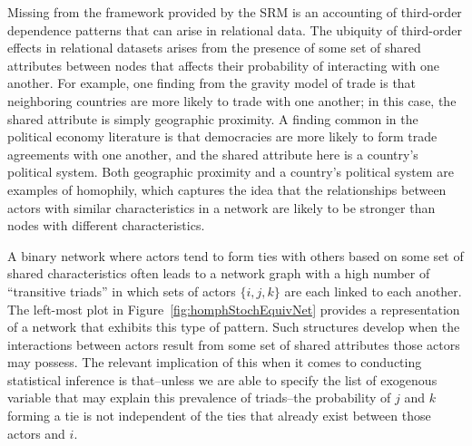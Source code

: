 \documentclass[12pt,pdflatex]{elsarticle}
\begin{document}
Missing from the framework provided by the SRM is an accounting of third-order dependence patterns that can arise in relational data. The ubiquity of third-order effects in relational datasets arises from the presence of some set of shared attributes between nodes that affects their probability of interacting with one another.
For example, one finding from the gravity model of trade is that neighboring countries are more likely to trade with one another; in this case, the shared attribute is simply geographic proximity. A finding common in the political economy literature is that democracies are more likely to form trade agreements with one another, and the shared attribute here is a country's political system. Both geographic proximity and a country's political system are examples of homophily, which captures the idea that the relationships between actors with similar characteristics in a network are likely to be stronger than nodes with different characteristics.

A binary network where actors tend to form ties with others based on some set of shared characteristics often leads to a network graph with a high number of ``transitive triads'' in which  sets of actors $\{i,j,k\}$ are each   linked to each another. The left-most plot in Figure~\ref{fig:homphStochEquivNet} provides a representation of a network that exhibits this type of pattern. Such structures  develop when the interactions between actors result from some set of shared attributes those actors may possess. The relevant implication of this when it comes to conducting statistical inference is that--unless we are able to specify the list of exogenous variable that may explain this prevalence of triads--the probability of $j$ and $k$ forming a tie is not independent of the ties that already exist between those actors and $i$. 
\end{document}
